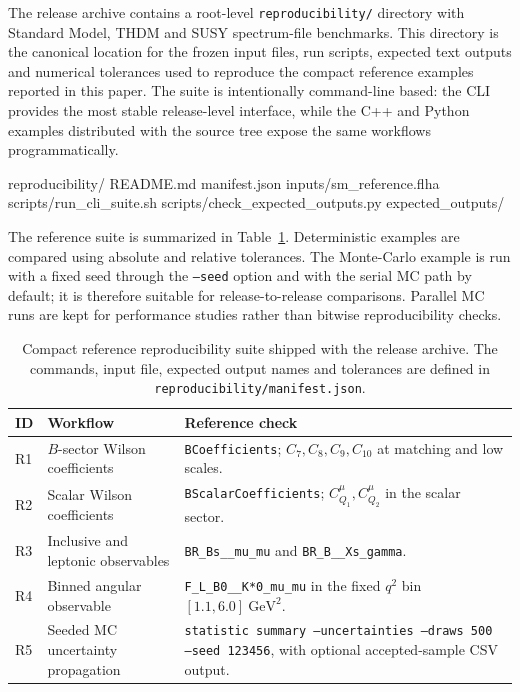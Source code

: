 \documentclass[preprint,11pt]{elsarticle}
\begin{document}
The release archive contains a root-level \texttt{reproducibility/} directory with Standard Model, THDM and SUSY spectrum-file benchmarks.  This directory is the canonical location for the frozen input files, run scripts, expected text outputs and numerical tolerances used to reproduce the compact reference examples reported in this paper.  The suite is intentionally command-line based: the CLI provides the most stable release-level interface, while the C++ and Python examples distributed with the source tree expose the same workflows programmatically.

\begin{terminal}
reproducibility/
  README.md
  manifest.json
  inputs/sm_reference.flha
  scripts/run_cli_suite.sh
  scripts/check_expected_outputs.py
  expected_outputs/
\end{terminal}

The reference suite is summarized in Table~\ref{tab:repro_suite}.  Deterministic examples are compared using absolute and relative tolerances.  The Monte-Carlo example is run with a fixed seed through the \texttt{--seed} option and with the serial MC path by default; it is therefore suitable for release-to-release comparisons.  Parallel MC runs are kept for performance studies rather than bitwise reproducibility checks.

\begin{table}[!ht]
\centering
\small
\renewcommand{\arraystretch}{1.15}
\begin{tabularx}{\textwidth}{@{}p{}p{}X@{}}
\toprule
\textbf{ID} & \textbf{Workflow} & \textbf{Reference check} \\
\midrule
R1 & $B$-sector Wilson coefficients &
\texttt{BCoefficients}; $C_7,C_8,C_9,C_{10}$ at matching and low scales. \\
R2 & Scalar Wilson coefficients &
\texttt{BScalarCoefficients}; $C_{Q_1}^{\mu},C_{Q_2}^{\mu}$ in the scalar sector. \\
R3 & Inclusive and leptonic observables &
\texttt{BR\_Bs\_\_mu\_mu} and \texttt{BR\_B\_\_Xs\_gamma}. \\
R4 & Binned angular observable &
\texttt{F\_L\_B0\_\_K*0\_mu\_mu} in the fixed $q^2$ bin $[1.1,6.0]~\mathrm{GeV}^2$. \\
R5 & Seeded MC uncertainty propagation &
\texttt{statistic summary --uncertainties --draws 500 --seed 123456}, with optional accepted-sample CSV output. \\
\bottomrule
\end{tabularx}
\caption{Compact reference reproducibility suite shipped with the release archive.  The commands, input file, expected output names and tolerances are defined in \texttt{reproducibility/manifest.json}.}
\label{tab:repro_suite}
\end{table}
\end{document}
